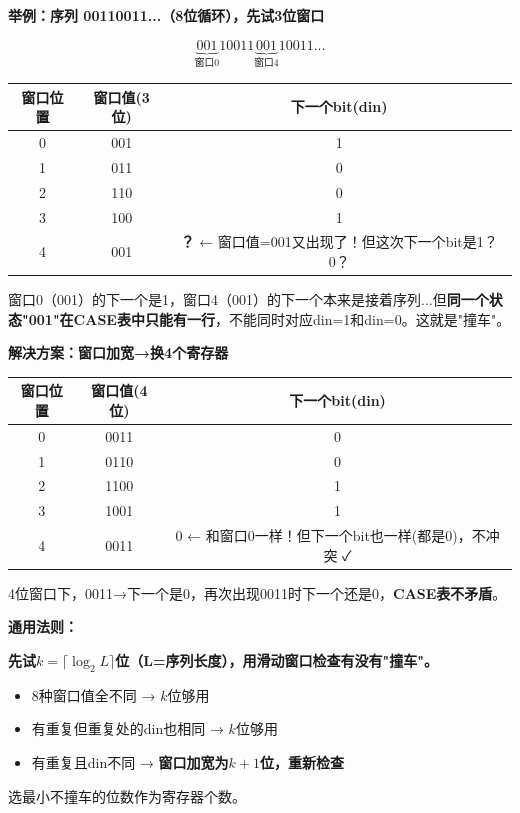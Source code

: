 \textbf{举例：序列 00110011...（8位循环），先试3位窗口}

\[
\underbrace{001}_{\text{窗口0}}10011\underbrace{001}_{\text{窗口4}}10011...
\]

\begin{center}
\begin{tabular}{c|c|c}
窗口位置 & 窗口值(3位) & 下一个bit(din) \\
\hline
0 & 001 & 1 \\
1 & 011 & 0 \\
2 & 110 & 0 \\
3 & 100 & 1 \\
4 & 001 & \textbf{？} ← 窗口值=001又出现了！但这次下一个bit是1？0？\\
\end{tabular}
\end{center}

窗口0（001）的下一个是1，窗口4（001）的下一个本来是接着序列...但\textbf{同一个状态"001"在CASE表中只能有一行}，不能同时对应din=1和din=0。这就是"撞车"。

\textbf{解决方案：窗口加宽→换4个寄存器}

\begin{center}
\begin{tabular}{c|c|c}
窗口位置 & 窗口值(4位) & 下一个bit(din) \\
\hline
0 & 0011 & 0 \\
1 & 0110 & 0 \\
2 & 1100 & 1 \\
3 & 1001 & 1 \\
4 & 0011 & 0 ← 和窗口0一样！但下一个bit也一样(都是0)，不冲突 ✓ \\
\end{tabular}
\end{center}

4位窗口下，0011→下一个是0，再次出现0011时下一个还是0，\textbf{CASE表不矛盾}。

\textbf{通用法则：}

\begin{keypoint}[寄存器位数的确定]
\textbf{先试$k = \lceil\log_2 L\rceil$位（L=序列长度），用滑动窗口检查有没有"撞车"。}

\begin{itemize}
  \item 8种窗口值全不同 → $k$位够用
  \item 有重复但重复处的din也相同 → $k$位够用
  \item 有重复且din不同 → \textbf{窗口加宽为$k+1$位，重新检查}
\end{itemize}

选最小不撞车的位数作为寄存器个数。
\end{keypoint}

